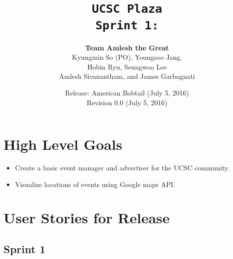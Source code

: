\documentclass[10pt]{article}
\title{\color{primary}\texttt{UCSC Plaza \\ Sprint 1:}}
\author{{\color{secondary}\textbf{Team Amlesh the Great}} \\ Kyungmin So (PO), Youngsoo Jang, \\ Hobin Ryu, Seungwoo Lee \\ Amlesh Sivanantham, and James Garbagnati }
\date{Release: American Bobtail (July 5, 2016) \\ Revision 0.0 (July 5, 2016)}
\newcommand{\fancysecX}[2] {{\color{primary}\section*{#1} \label{sec:#2}}}
\newcommand{\fancysubX}[2] {{\color{primary}\subsection*{#1} \label{sec:#2}}}
\begin{document}
\maketitle

\fancysecX{High Level Goals}{goals}

    \begin{itemize}
        \item Create a basic event manager and advertiser for the UCSC community.
        \item Visualize locations of events using Google maps API.
    \end{itemize}
    
\fancysecX{User Stories for Release}{stories}
    
    \fancysubX{Sprint 1}{sprint1}
     
\end{document}
